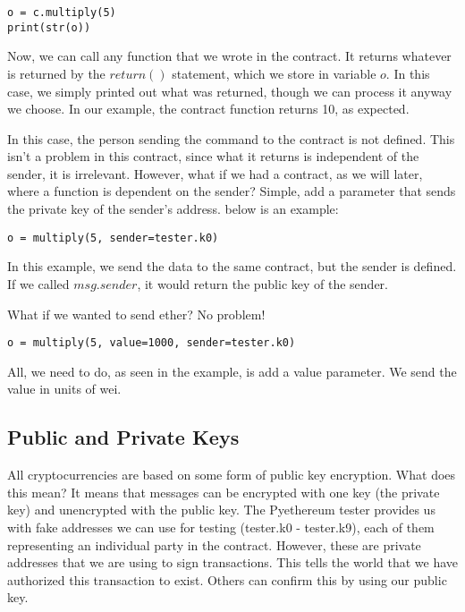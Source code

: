 \documentclass[12pt]{article}
\begin{document}
\begin{verbatim}
o = c.multiply(5)
print(str(o))
\end{verbatim}

Now, we can call any function that we wrote in the contract. It returns whatever is returned by the $return()$ statement, which we store in variable $o$. In this case, we simply printed out what was returned, though we can process it anyway we choose. In our example, the contract function returns 10, as expected.

In this case, the person sending the command to the contract is not defined. This isn't a problem in this contract, since what it returns is independent of the sender, it is irrelevant. However, what if we had a contract, as we will later, where a function is dependent on the sender? Simple, add a parameter that sends the private key of the sender's address. below is an example:

\begin{verbatim}
o = multiply(5, sender=tester.k0)
\end{verbatim}

In this example, we send the data to the same contract, but the sender is defined. If we called $msg.sender$, it would return the public key of the sender.

What if we wanted to send ether? No problem! 
\begin{verbatim}
o = multiply(5, value=1000, sender=tester.k0)
\end{verbatim}

All, we need to do, as seen in the example, is add a value parameter. We send the value in units of wei.

\cite{test_contracts.py,Usingpyethereum.tester}

\subsection{Public and Private Keys}
All cryptocurrencies are based on some form of public key encryption. What does this mean? It means that messages can be encrypted with one key (the private key) and unencrypted with the public key. The Pyethereum tester provides us with fake addresses we can use for testing (tester.k0 - tester.k9), each of them representing an individual party in the contract. However, these are private addresses that we are using to sign transactions. This tells the world that we have authorized this transaction to exist. Others can confirm this by using our public key. 
\end{document}
